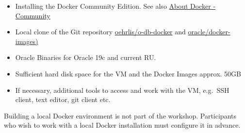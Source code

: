 \begin{itemize}
\tightlist
\item
  Installing the Docker Community Edition. See also
  \href{https://docs.docker.com/install/}{About Docker - Community}
\item
  Local clone of the Git repository
  \href{https://github.com/oehrlis/o-db-docker}{oehrlis/o-db-docker} and
  \href{https://github.com/oracle/docker-images}{oracle/docker-images)}
\item
  Oracle Binaries for Oracle 19c and current RU.
\item
  Sufficient hard disk space for the VM and the Docker Images approx.
  50GB
\item
  If necessary, additional tools to access and work with the VM,
  e.g.~SSH client, text editor, git client etc.
\end{itemize}

Building a local Docker environment is not part of the workshop.
Participants who wish to work with a local Docker installation must
configure it in advance.
